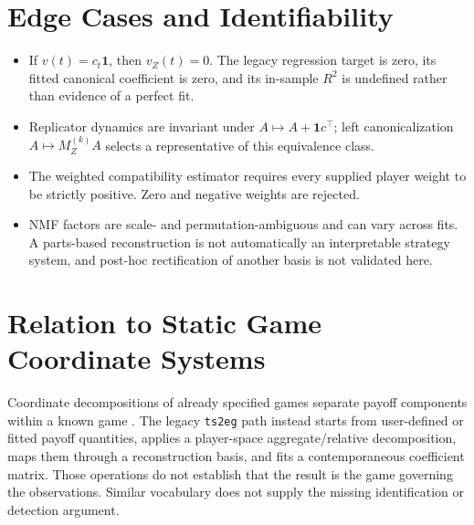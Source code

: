 \documentclass[11pt]{article}
\newcommand{\one}{\mathbf{1}}
\begin{document}
\section{Edge Cases and Identifiability}
\begin{itemize}[leftmargin=*]
\item If $v(t)=c_t\one$, then $v_Z(t)=0$. The legacy regression target is zero, its fitted canonical coefficient is zero, and its in-sample $R^2$ is undefined rather than evidence of a perfect fit.
\item Replicator dynamics are invariant under $A\mapsto A+\one c^\top$; left canonicalization $A\mapsto M_Z^{(k)}A$ selects a representative of this equivalence class.
\item The weighted compatibility estimator requires every supplied player weight to be strictly positive. Zero and negative weights are rejected.
\item NMF factors are scale- and permutation-ambiguous and can vary across fits. A parts-based reconstruction is not automatically an interpretable strategy system, and post-hoc rectification of another basis is not validated here.
\end{itemize}

\section{Relation to Static Game Coordinate Systems}
Coordinate decompositions of already specified games separate payoff components
within a known game \cite{jessie-saari}. The legacy \texttt{ts2eg} path instead
starts from user-defined or fitted payoff quantities, applies a player-space
aggregate/relative decomposition, maps them through a reconstruction basis, and
fits a contemporaneous coefficient matrix. Those operations do not establish
that the result is the game governing the observations. Similar vocabulary does
not supply the missing identification or detection argument.
\end{document}
